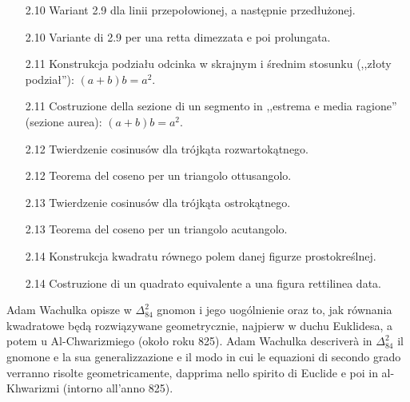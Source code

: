 \begin{enumerate}
    \item [2.10] Wariant 2.9 dla linii przepołowionej, a następnie przedłużonej. %
    \item [2.10] Variante di 2.9 per una retta dimezzata e poi prolungata. %

    \item [2.11] Konstrukcja podziału odcinka w skrajnym i średnim stosunku (,,złoty podział''): $(a+b)b = a^2$. %
    \item [2.11] Costruzione della sezione di un segmento in ,,estrema e media ragione'' (sezione aurea): $(a+b)b = a^2$. %

    \item [2.12] Twierdzenie cosinusów dla trójkąta rozwartokątnego. %
    \item [2.12] Teorema del coseno per un triangolo ottusangolo. %

    \item [2.13] Twierdzenie cosinusów dla trójkąta ostrokątnego. %
    \item [2.13] Teorema del coseno per un triangolo acutangolo. %

    \item [2.14] Konstrukcja kwadratu równego polem danej figurze prostokreślnej. %
    \item [2.14] Costruzione di un quadrato equivalente a una figura rettilinea data. %
\end{enumerate}

Adam Wachulka opisze w $\Delta_{84}^{2}$ gnomon i jego uogólnienie oraz to, jak równania kwadratowe będą rozwiązywane geometrycznie, najpierw w duchu Euklidesa, a potem u Al-Chwarizmiego (około roku 825). %
Adam Wachulka descriverà in $\Delta_{84}^{2}$ il gnomone e la sua generalizzazione e il modo in cui le equazioni di secondo grado verranno risolte geometricamente, dapprima nello spirito di Euclide e poi in al-Khwarizmi (intorno all'anno 825). %

%
